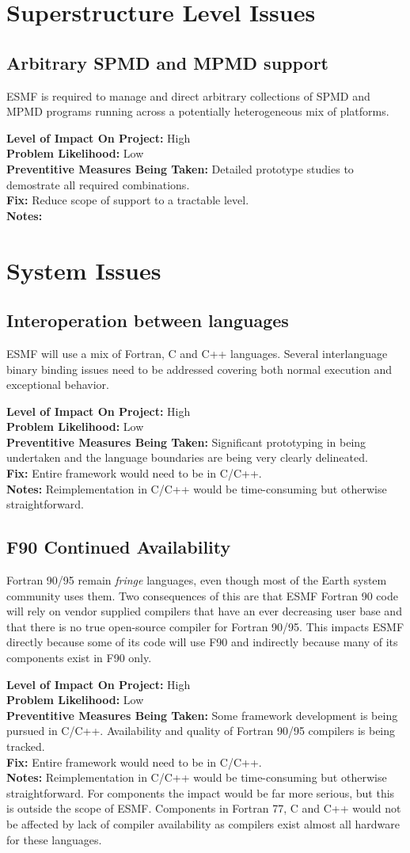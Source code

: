 \documentclass[english]{article}
\newcommand{\req}[1]{\section{\hspace{.2in}#1}}
\newcommand{\sreq}[1]{\subsection{\hspace{.2in}#1}}
\newenvironment
{reqlist}
{\begin{list} {} {} \rm \item[]}
{\end{list}}
\begin{document}
\req{Superstructure Level Issues}
\sreq{Arbitrary SPMD and MPMD support}
ESMF is required to manage and direct arbitrary collections of SPMD and MPMD programs 
running across a potentially heterogeneous mix of platforms.
\begin{reqlist}
{\bf Level of Impact On Project:} High \\
{\bf Problem Likelihood:} Low \\
{\bf Preventitive Measures Being Taken:} Detailed prototype studies to demostrate all required
combinations.\\
{\bf Fix:} Reduce scope of support to a tractable level.\\
{\bf Notes:}
\end{reqlist}

\req{System Issues}
\sreq{Interoperation between languages}
ESMF will use a mix of Fortran, C and C++ languages. Several interlanguage binary binding
issues need to be addressed covering both normal execution and exceptional
behavior.
\begin{reqlist}
{\bf Level of Impact On Project:} High \\
{\bf Problem Likelihood:} Low\\
{\bf Preventitive Measures Being Taken:} Significant prototyping in being undertaken and
the language boundaries are being very clearly delineated.\\
{\bf Fix:} Entire framework would need to be in C/C++.\\
{\bf Notes:} Reimplementation in C/C++ would be time-consuming but
otherwise straightforward.
\end{reqlist}

\sreq{F90 Continued Availability}
Fortran 90/95 remain {\it fringe} languages, even though most of the Earth system
community uses them. Two consequences of this are that ESMF Fortran 90 code will
rely on vendor supplied compilers that have an ever decreasing user base and
that there is no true open-source compiler for Fortran 90/95.
This impacts ESMF directly because some of its code will use F90 and
indirectly because many of its components exist in F90 only.
\begin{reqlist}
{\bf Level of Impact On Project:} High \\
{\bf Problem Likelihood:} Low\\
{\bf Preventitive Measures Being Taken:} Some framework development is being pursued in C/C++.
Availability and quality of Fortran 90/95 compilers
is being tracked.\\
{\bf Fix:} Entire framework would need to be in C/C++.\\
{\bf Notes:} Reimplementation in C/C++ would be time-consuming but
otherwise straightforward. For components the impact would be far more
serious, but this is outside the scope of ESMF.
Components in Fortran 77, C and C++ would not be affected by lack of 
compiler availability as compilers exist almost all hardware for these languages.
\end{reqlist}
\end{document}

